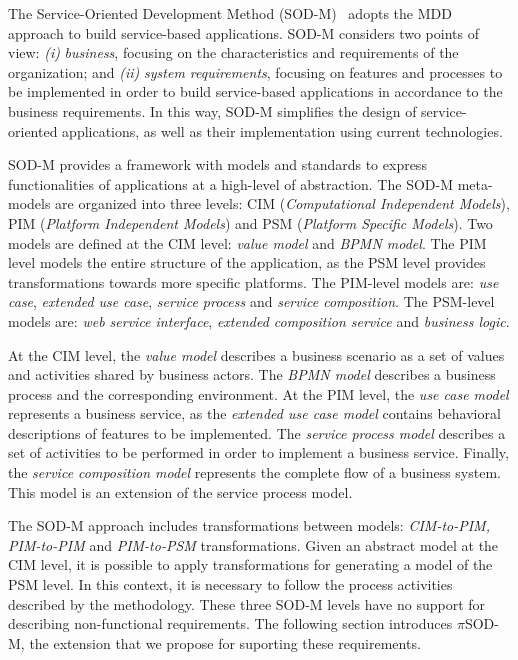 
The Service-Oriented Development Method (SOD-M)~\cite{decastro1}
adopts  the MDD approach to build service-based applications. SOD-M considers two points of view:
\textit{(i)} \textit{business}, focusing on the characteristics and requirements
of the organization; and 
\textit{(ii)} \textit{system requirements}, focusing on
features and processes to be implemented in order to build service-based applications in accordance to the business requirements. In
this way, SOD-M  simplifies the design of service-oriented applications, as
well as their implementation using current technologies.

SOD-M provides a framework with models and standards to express functionalities
of applications at a high-level of abstraction. The SOD-M meta-models are organized 
into three levels: CIM (\textit{Computational Independent Models}), 
PIM (\textit{Platform Independent Models}) and PSM (\textit{Platform Specific Models}).
Two models are defined at the CIM level: \textit{value model} 
and \textit{BPMN model}. 
The PIM level models the entire structure of the application, as
the PSM level provides transformations towards more specific platforms.
The PIM-level models are: \textit{use case}, \textit{extended use case}, \textit{service process} and
\textit{service composition}. The PSM-level models are: \textit{web service interface}, \textit{extended composition service} and \textit{business logic}. 
 
At the CIM level, the \textit{value model} describes a business
scenario as a set of values and activities shared by business actors. 
The \textit{BPMN model} describes a business process and the corresponding environment. 
At the PIM level, the \textit{use case model} represents
a business service, as the \textit{extended use case model} contains 
behavioral descriptions of features to be implemented. 
The \textit{service process model} describes a set of
activities to be performed in order to implement a business service.
Finally, the \textit{service composition model} represents the complete flow of a business system. 
This model is an extension of the service process model. 

The SOD-M approach includes transformations between models:
\textit{CIM-to-PIM, PIM-to-PIM} and \textit{PIM-to-PSM} transformations. Given
an abstract model at the CIM level, it is possible to apply transformations for
generating a model of the PSM level. In this context, it is necessary to
follow the process activities described by the methodology. 
%
These three SOD-M levels have no support for describing non-functional requirements. The following section introduces $\pi$SOD-M, the extension that we propose for suporting these requirements.



